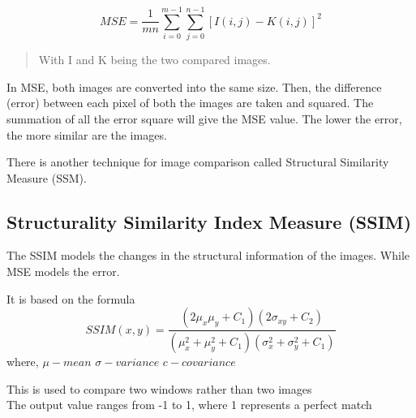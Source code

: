 \documentclass{article}
\begin{document}
 
 \begin{equation}
  MSE = \frac{1}{mn}   \sum^{m-1}_{i=0}  \sum^{n-1}_{j=0} [I(i,j) - K(i,j)] ^2
\end{equation}  
\begin{quote}
With I and K being the two compared images.
\end{quote}


In MSE, both images are converted into the same size. Then, the difference (error) between each pixel of both the images are taken and squared. The summation of all the error square will give the MSE value. 
The lower the error, the more similar are the images. 

There is another technique for image comparison called Structural Similarity Measure (SSM). 

\subsection*{Structurality Similarity Index Measure (SSIM)}

The SSIM models the changes in the structural information of the images. While MSE models the error. 

It is based on the formula \cite{third}
\begin{equation}
SSIM(x,y) = \frac{(2\mu_{x}\mu_{y}+C_{1})(2\sigma_{xy}+C_{2})}{(\mu^{2}_{x}+\mu^{2}_{y}+C_{1})(\sigma^{2}_{x}+\sigma^{2}_{y}+C_{1})}
\end{equation}
where, 
$\mu - mean $
$\sigma - variance $
$c - covariance $

This is used to compare two windows rather than two images \\ 
The output value ranges from -1 to 1, where 1 represents a perfect match
\end{document}
